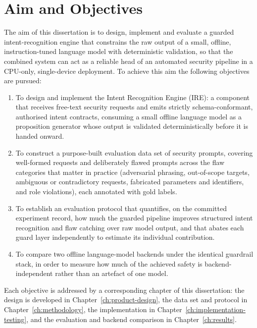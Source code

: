 \section{Aim and Objectives}\label{sec:aim-and-objectives}

The aim of this dissertation is to design, implement and evaluate a guarded
intent-recognition engine that constrains the raw output of a small, offline,
instruction-tuned language model with deterministic validation, so that the
combined system can act as a reliable head of an automated security pipeline in a
CPU-only, single-device deployment. To achieve this aim the following objectives
are pursued:

\begin{enumerate}
\item To design and implement the Intent Recognition Engine (IRE): a component
that receives free-text security requests and emits strictly
schema-conformant, authorised intent contracts, consuming a small offline
language model as a proposition generator whose output is validated
deterministically before it is handed onward.
\item To construct a purpose-built evaluation data set of security prompts,
covering well-formed requests and deliberately flawed prompts across the flaw
categories that matter in practice (adversarial phrasing, out-of-scope targets,
ambiguous or contradictory requests, fabricated parameters and identifiers, and
role violations), each annotated with gold labels.
\item To establish an evaluation protocol that quantifies, on the committed
experiment record, how much the guarded pipeline improves structured intent
recognition and flaw catching over raw model output, and that abates each guard
layer independently to estimate its individual contribution.
\item To compare two offline language-model backends under the identical
guardrail stack, in order to measure how much of the achieved safety is
backend-independent rather than an artefact of one model.
\end{enumerate}

Each objective is addressed by a corresponding chapter of this dissertation:
the design is developed in Chapter~\ref{ch:product-design}, the data set and protocol in
Chapter~\ref{ch:methodology}, the implementation in
Chapter~\ref{ch:implementation-testing}, and the evaluation and backend comparison in
Chapter~\ref{ch:results}.